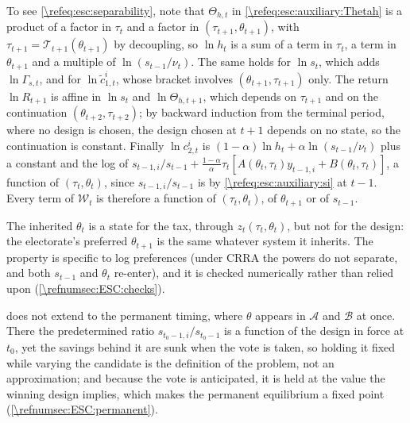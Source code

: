 To see \eqref{\refeq:esc:separability}, note that $\Theta_{h,t}$ in \eqref{\refeq:esc:auxiliary:Thetah} is a product of a factor in $\tau_t$ and a factor in $\left(\tau_{t+1},\theta_{t+1}\right)$, with $\tau_{t+1} = \mathcal{T}_{t+1}(\theta_{t+1})$ by decoupling, so $\ln h_t$ is a sum of a term in $\tau_t$, a term in $\theta_{t+1}$ and a multiple of $\ln(s_{t-1}/\nu_t)$. The same holds for $\ln s_t$, which adds $\ln\Gamma_{s,t}$, and for $\ln \tilde c_{1,t}^i$, whose bracket involves $\left(\theta_{t+1},\tau_{t+1}\right)$ only. The return $\ln R_{t+1}$ is affine in $\ln s_t$ and $\ln\Theta_{h,t+1}$, which depends on $\tau_{t+1}$ and on the continuation $\left(\theta_{t+2},\tau_{t+2}\right)$; by backward induction from the terminal period, where no design is chosen, the design chosen at $t+1$ depends on no state, so the continuation is constant. Finally $\ln c_{2,t}^i$ is $(1-\alpha)\ln h_t + \alpha\ln(s_{t-1}/\nu_t)$ plus a constant and the log of $s_{t-1,i}/s_{t-1} + \frac{1-\alpha}{\alpha}\tau_t\left[A(\theta_t,\tau_t)y_{t-1,i} + B(\theta_t,\tau_t)\right]$, a function of $\left(\tau_t,\theta_t\right)$, since $s_{t-1,i}/s_{t-1}$ is by \eqref{\refeq:esc:auxiliary:si} at $t-1$. Every term of $\mathcal{W}_t$ is therefore a function of $\left(\tau_t,\theta_t\right)$, of $\theta_{t+1}$ or of $s_{t-1}$.

The inherited $\theta_t$ is a state for the tax, through $z_t\left(\tau_t,\theta_t\right)$, but not for the design: the electorate's preferred $\theta_{t+1}$ is the same whatever system it inherits. The property is specific to log preferences (under CRRA the powers do not separate, and both $s_{t-1}$ and $\theta_t$ re-enter), and it is checked numerically rather than relied upon (\cref{\refnumsec:ESC:checks}).

 does not extend to the permanent timing, where $\theta$ appears in $\mathcal{A}$ and $\mathcal{B}$ at once. There the predetermined ratio $s_{t_0-1,i}/s_{t_0-1}$ is a function of the design in force at $t_0$, yet the savings behind it are sunk when the vote is taken, so holding it fixed while varying the candidate is the definition of the problem, not an approximation; and because the vote is anticipated, it is held at the value the winning design implies, which makes the permanent equilibrium a fixed point (\cref{\refnumsec:ESC:permanent}).
